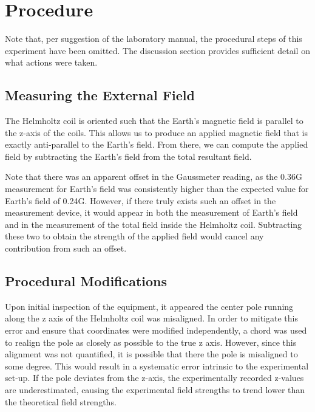 \documentclass[a4paper]{article}
\begin{document}
\section{Procedure}

Note that, per suggestion of the laboratory manual, the procedural steps of this experiment have been omitted. The discussion section provides sufficient detail on what actions were taken.

\subsection{Measuring the External Field}
The Helmholtz coil is oriented such that the Earth's magnetic field is parallel to the z-axis of the coils. This allows us to produce an applied magnetic field that is exactly anti-parallel to the Earth's field. From there, we can compute the applied field by subtracting the Earth's field from the total resultant field.

Note that there was an apparent offset in the Gaussmeter reading, as the 0.36G measurement for Earth's field was consistently higher than the expected value for Earth's field of 0.24G. However, if there truly exists such an offset in the measurement device, it would appear in both the measurement of Earth's field and in the measurement of the total field inside the Helmholtz coil. Subtracting these two to obtain the strength of the applied field would cancel any contribution from such an offset.

\subsection{Procedural Modifications}

Upon initial inspection of the equipment, it appeared the center pole running along the z axis of the Helmholtz coil was misaligned. In order to mitigate this error and ensure that coordinates were modified independently, a chord was used to realign the pole as closely as possible to the true z axis. However, since this alignment was not quantified, it is possible that there the pole is misaligned to some degree. This would result in a systematic error intrinsic to the experimental set-up. If the pole deviates from the z-axis, the experimentally recorded z-values are underestimated, causing the experimental field strengths to trend lower than the theoretical field strengths.
\end{document}
